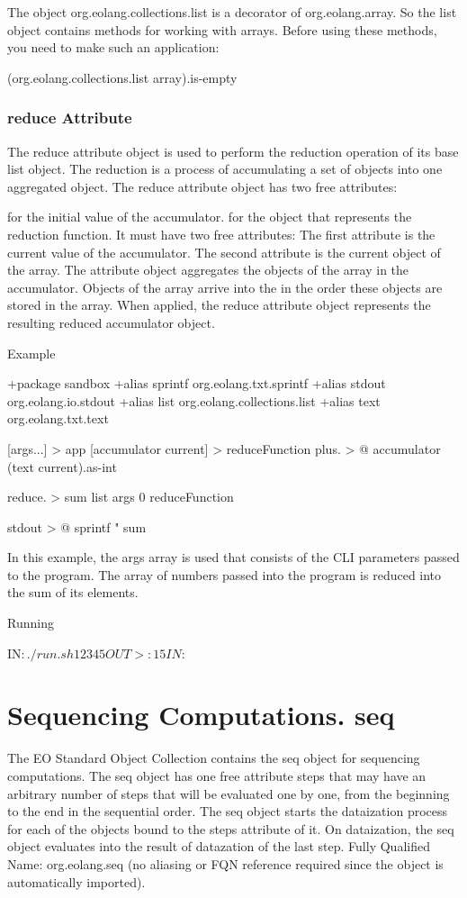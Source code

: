 \documentclass[12pt]{book}
\begin{document}
The object org.eolang.collections.list is a decorator of org.eolang.array. So the list object contains methods for working with arrays. Before using these methods, you need to make such an application:
\begin{ffcode}
    (org.eolang.collections.list array).is-empty
\end{ffcode}

\subsubsection{reduce Attribute}
The reduce attribute object is used to perform the reduction operation of its base list object. The reduction is a process of accumulating a set of objects into one aggregated object.
The reduce attribute object has two free attributes:

 for the initial value of the accumulator.
 for the object that represents the reduction function. It must have two free attributes:
The first attribute is the current value of the accumulator.
The second attribute is the current object of the array.
The  attribute object aggregates the objects of the array in the accumulator. Objects of the array arrive into the  in the order these objects are stored in the array.
When applied, the reduce attribute object represents the resulting reduced accumulator object.

Example
\begin{ffcode}
+package sandbox
+alias sprintf org.eolang.txt.sprintf
+alias stdout org.eolang.io.stdout
+alias list org.eolang.collections.list
+alias text org.eolang.txt.text

[args...] > app
  [accumulator current] > reduceFunction
    plus. > @
      accumulator
      (text current).as-int

  reduce. > sum
    list args
    0
    reduceFunction

  stdout > @
    sprintf
      "%
      sum
\end{ffcode}

In this example, the args array is used that consists of the CLI parameters passed to the program. The array of numbers passed into the program is reduced into the sum of its elements.

Running
\begin{ffcode}
IN$: ./run.sh 1 2 3 4 5
OUT>: 15
IN$: 
\end{ffcode}

\section{Sequencing Computations. seq}
The EO Standard Object Collection contains the seq object for sequencing computations.
The seq object has one free attribute steps that may have an arbitrary number of steps that will be evaluated one by one, from the beginning to the end in the sequential order.
The seq object starts the dataization process for each of the objects bound to the steps attribute of it.
On dataization, the seq object evaluates into the result of datazation of the last step.
Fully Qualified Name: org.eolang.seq (no aliasing or FQN reference required since the object is automatically imported).
\end{document}
